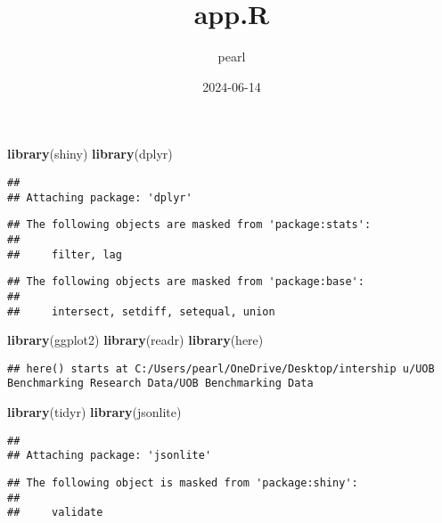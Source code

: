 \documentclass[
]{article}
\title{app.R}
\author{pearl}
\date{2024-06-14}
\newenvironment{Shaded}{\begin{snugshade}}{\end{snugshade}}
\newcommand{\FunctionTok}[1]{\textcolor[rgb]{0.13,0.29,0.53}{\textbf{#1}}}
\newcommand{\NormalTok}[1]{#1}
\begin{document}
\maketitle

\begin{Shaded}
\begin{Highlighting}[]
\FunctionTok{library}\NormalTok{(shiny)}
\FunctionTok{library}\NormalTok{(dplyr)}
\end{Highlighting}
\end{Shaded}

\begin{verbatim}
## 
## Attaching package: 'dplyr'
\end{verbatim}

\begin{verbatim}
## The following objects are masked from 'package:stats':
## 
##     filter, lag
\end{verbatim}

\begin{verbatim}
## The following objects are masked from 'package:base':
## 
##     intersect, setdiff, setequal, union
\end{verbatim}

\begin{Shaded}
\begin{Highlighting}[]
\FunctionTok{library}\NormalTok{(ggplot2)}
\FunctionTok{library}\NormalTok{(readr)}
\FunctionTok{library}\NormalTok{(here)}
\end{Highlighting}
\end{Shaded}

\begin{verbatim}
## here() starts at C:/Users/pearl/OneDrive/Desktop/intership u/UOB Benchmarking Research Data/UOB Benchmarking Data
\end{verbatim}

\begin{Shaded}
\begin{Highlighting}[]
\FunctionTok{library}\NormalTok{(tidyr)}
\FunctionTok{library}\NormalTok{(jsonlite)}
\end{Highlighting}
\end{Shaded}

\begin{verbatim}
## 
## Attaching package: 'jsonlite'
\end{verbatim}

\begin{verbatim}
## The following object is masked from 'package:shiny':
## 
##     validate
\end{verbatim}
\end{document}
